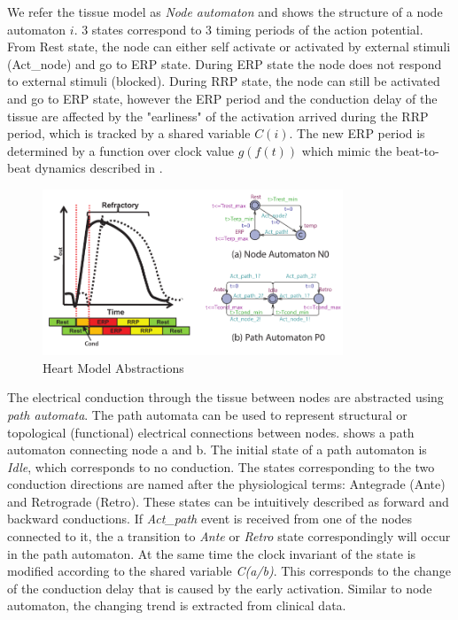  We refer the tissue model as \emph{Node automaton} and  shows the structure of a node automaton $i$. 3 states correspond to 3 timing periods of the action potential. From \textsf{Rest} state, the node can either self activate or activated by external stimuli (Act\_node) and go to \textsf{ERP} state. During \textsf{ERP} state the node does not respond to external stimuli (blocked). During \textsf{RRP} state, the node can still be activated and go to \textsf{ERP} state, however the ERP period and the conduction delay of the tissue are affected by the "earliness" of the activation arrived during the RRP period, which is tracked by a shared variable $C(i)$. The new ERP period is determined by a function over clock value $g(f(t))$ which mimic the beat-to-beat dynamics described in \cite{josephson}. 
\begin{figure}[!t]
		\centering
		\includegraphics[width=0.8\textwidth]{figs/init_abs.pdf}
		\caption{\small Heart Model Abstractions}
		\label{fig:init}
\end{figure}
The electrical conduction through the tissue between nodes are abstracted using \emph{path automata}. The path automata can be used to represent structural or topological (functional) electrical connections between nodes.  shows a path automaton connecting node a and b. The initial state of a path automaton is \emph{Idle}, which corresponds to no conduction. The states corresponding to the two conduction directions are named after the physiological terms: Antegrade (Ante) and Retrograde (Retro). These states can be intuitively described as forward and backward conductions. If \emph{Act\_path} event is received from one of the nodes connected to it, the a transition to \emph{Ante} or \emph{Retro} state correspondingly will occur in the path automaton. At the same time the clock invariant of the state is modified according to the shared variable \emph{C(a/b)}. This corresponds to the change of the conduction delay that is caused by the early activation. Similar to node automaton, the changing trend is extracted from clinical data. 

